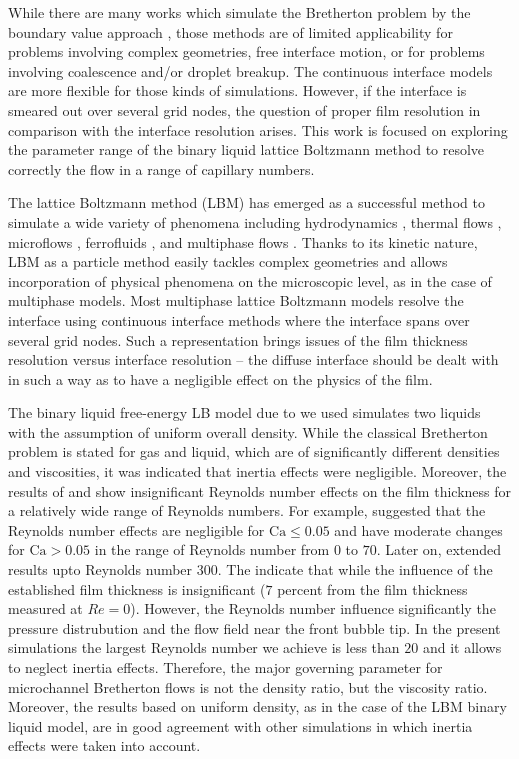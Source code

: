 \documentclass[preprint,12pt]{elsarticle}
\newcommand{\Ca}{\mathrm{Ca}}
\begin{document}
While there are many works which simulate the Bretherton problem by the boundary value approach
\cite{ingham-plates,heil-bretherton}, those methods are of limited applicability for problems
involving complex geometries, free interface motion, or for problems involving coalescence and/or
droplet breakup. The continuous interface models are more flexible for those kinds of simulations.
However, if the interface is smeared out over several grid nodes, the question of
proper film resolution in comparison with the interface resolution arises.  This work is focused on
exploring the parameter range of the binary liquid lattice
Boltzmann method to resolve correctly the flow in a range of capillary numbers.

The lattice Boltzmann method (LBM) has emerged as a successful method to simulate
a wide variety of phenomena including hydrodynamics \cite{yu}, thermal flows
\cite{karlin-minimalmodels}, microflows \cite{ansumali-small-knudsen},
ferrofluids \cite{kuzmin-aniso}, and multiphase flows
\cite{swift,Shan-chen:extended}. Thanks to its kinetic nature, LBM as a particle
method easily tackles complex geometries and allows incorporation of
physical phenomena on the microscopic level, as in the case of multiphase models. Most
multiphase lattice Boltzmann models \cite{swift, Shan-chen:extended} resolve
the interface using continuous interface methods where the interface spans over several grid nodes.
Such a representation
brings issues of the film thickness resolution versus interface
resolution -- the diffuse interface should be dealt with in such a way as to have a
negligible effect on the physics of the film.

The binary liquid free-energy LB model due to \citet{swift} we used
simulates two liquids with the assumption of uniform overall
density. While the classical Bretherton problem is stated for gas and liquid, which are of
significantly
different densities and viscosities, it was indicated \cite{bretherton} that inertia effects were
negligible. Moreover, the results of \citet{giavedoni-numerical} and \citet{heil-bretherton} show
{\color{red} insignificant} Reynolds number effects on the film thickness for a relatively wide
range of Reynolds
numbers. 
{\color{red} For example, \citet{giavedoni-numerical} suggested that the Reynolds number effects
are negligible for $\Ca\leq0.05$ and have moderate changes for $\Ca>0.05$ in the range of Reynolds
number from $0$ to $70$. Later on, \citet{heil-bretherton} extended results upto Reynolds number
$300$. The indicate that while the influence of the established film thickness is insignificant
($7$ percent from the film thickness measured at $Re=0$). However, the Reynolds number influence
significantly the pressure distrubution and the flow field near the front bubble tip. In the present
simulations the largest Reynolds number we achieve is less than $20$ and it allows to neglect 
inertia effects.} 
Therefore, the major governing parameter for microchannel Bretherton flows is not the density ratio,
but the
viscosity ratio. Moreover, the results based on uniform density, as in the case of the LBM
binary liquid model, are in good agreement with other simulations
\cite{giavedoni-numerical,heil-bretherton} in which inertia effects were taken into account.
\end{document}
